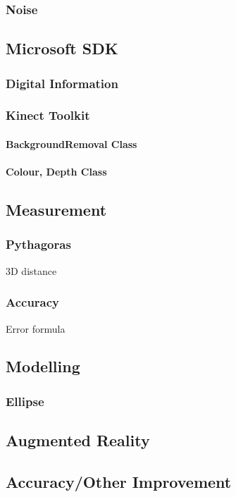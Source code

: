 \subsubsection{Noise}




\subsection{Microsoft SDK}

\subsubsection{Digital Information}

\subsubsection{Kinect Toolkit}

\paragraph{BackgroundRemoval Class}

\paragraph{Colour, Depth Class}


\subsection{Measurement}

\subsubsection{Pythagoras}
3D distance \cite{nonContact2017}\\

\subsubsection{Accuracy}
Error formula \cite{nonContact2017}\\

\subsection{Modelling}

\subsubsection{Ellipse}


\subsection{Augmented Reality}


\subsection{Accuracy/Other Improvement }